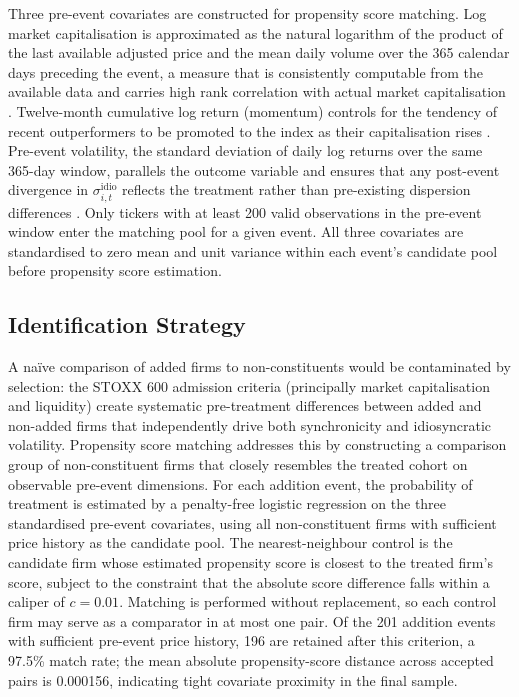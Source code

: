 \documentclass[12pt, a4paper]{article}
\begin{document}
Three pre-event covariates are constructed for propensity score matching. Log market capitalisation is approximated as the natural logarithm of the product of the last available adjusted price and the mean daily volume over the 365 calendar days preceding the event, a measure that is consistently computable from the available data and carries high rank correlation with actual market capitalisation \citep{fama1993common}. Twelve-month cumulative log return (momentum) controls for the tendency of recent outperformers to be promoted to the index as their capitalisation rises \citep{jegadeesh1993returns}. Pre-event volatility, the standard deviation of daily log returns over the same 365-day window, parallels the outcome variable and ensures that any post-event divergence in $\sigma^{\text{idio}}_{i,t}$ reflects the treatment rather than pre-existing dispersion differences \citep{dasgupta2010price}. Only tickers with at least 200 valid observations in the pre-event window enter the matching pool for a given event. All three covariates are standardised to zero mean and unit variance within each event's candidate pool before propensity score estimation.\\

\subsection{Identification Strategy}
\label{sec:identification}

A naïve comparison of added firms to non-constituents would be contaminated by selection: the STOXX 600 admission criteria (principally market capitalisation and liquidity) create systematic pre-treatment differences between added and non-added firms that independently drive both synchronicity and idiosyncratic volatility. Propensity score matching \citep{rosenbaum1983central} addresses this by constructing a comparison group of non-constituent firms that closely resembles the treated cohort on observable pre-event dimensions. For each addition event, the probability of treatment is estimated by a penalty-free logistic regression on the three standardised pre-event covariates, using all non-constituent firms with sufficient price history as the candidate pool. The nearest-neighbour control is the candidate firm whose estimated propensity score is closest to the treated firm's score, subject to the constraint that the absolute score difference falls within a caliper of $c = 0.01$. Matching is performed without replacement, so each control firm may serve as a comparator in at most one pair. Of the 201 addition events with sufficient pre-event price history, 196 are retained after this criterion, a 97.5\% match rate; the mean absolute propensity-score distance across accepted pairs is 0.000156, indicating tight covariate proximity in the final sample.\\
\end{document}
